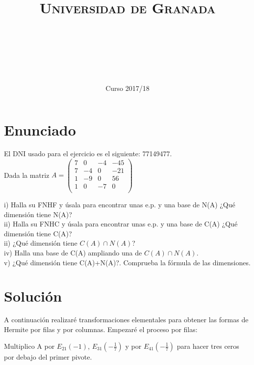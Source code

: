 \documentclass[11pt, a4paper]{article}
\title{
  \normalfont \normalsize 
  \textsc{Universidad de Granada} \\ [25pt]    %
  \horrule{0.5pt} \\[0.4cm] %
  \huge \sffamily\subject\\ %
  \horrule{2pt} \\[0.5cm] %
}
\author{\Large\sffamily{\docauthor}}
\date{\vspace{-1.5em} \normalsize \sffamily Curso 2017/18}
\newif\IfInSansMode
\theoremstyle{theorem-style}
\theoremstyle{definition-style}
\theoremstyle{remark-style}
\theoremstyle{example-style}
\begin{document}
\maketitle  %
\vfill
\begin{center}
\end{center}
\newpage
\tableofcontents    %
\newpage



\section{Enunciado}
El DNI usado para el ejercicio es el siguiente: 77149477. \\

Dada la matriz $A = 
	\begin{pmatrix}
	7 & 0 & -4 & -45 \\
	7 & -4 & 0 & -21 \\
	1 & -9 & 0 & 56 \\
	1 & 0 & -7 & 0 \\
	\end{pmatrix}$
	
i) Halla su FNHF y úsala para encontrar unas e.p. y una base de N(A) ¿Qué dimensión tiene N(A)? \\
ii) Halla su FNHC y úsala para encontrar unas e.p. y una base de C(A) ¿Qué dimensión tiene C(A)? \\
ii) ¿Qué dimensión tiene $C(A) \cap N(A)$? \\
iv) Halla una base de C(A) ampliando una de $C(A) \cap N(A)$. \\
v) ¿Qué dimensión tiene C(A)+N(A)?. Comprueba la fórmula de las dimensiones. \\

\section{Solución}

A continuación realizaré transformaciones elementales para obtener las formas de Hermite por filas y por columnas. Empezaré el proceso por filas:

Multiplico A por $E_{21}(-1)$, $E_{31}(-\frac{1}{7})$ y por $E_{41}(-\frac{1}{7})$ para hacer tres ceros por debajo del primer pivote.
\end{document}
